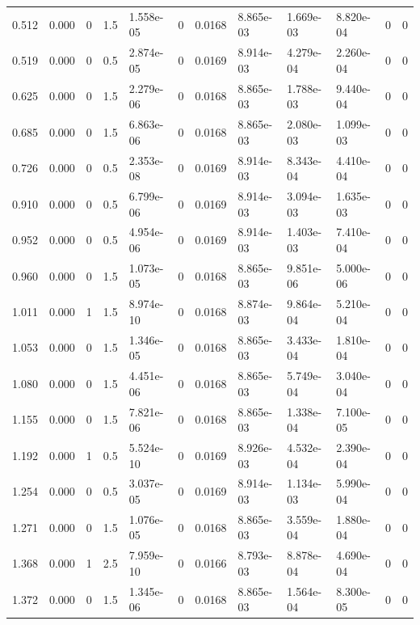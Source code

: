 \documentclass[preview]{standalone}
\begin{document}
{{\begin{tabular}{L{1.2cm}C{1.2cm} C{0.3cm}C{0.5cm} C{1.4cm}C{1.4cm} C{1.4cm}C{1.4cm} C{1.6cm}C{1.6cm} C{1.6cm}C{1.6cm}}
  0.512  &  0.000  & 0     & 1.5 &  1.558e-05  & 0  &  0.0168&   8.865e-03& 1.669e-03 & 8.820e-04   &  0 & 0  \\ 
  0.519  &  0.000  & 0     & 0.5 &  2.874e-05  & 0  &  0.0169&   8.914e-03& 4.279e-04 & 2.260e-04   &  0 & 0  \\ 
  0.625  &  0.000  & 0     & 1.5 &  2.279e-06  & 0  &  0.0168&   8.865e-03& 1.788e-03 & 9.440e-04   &  0 & 0  \\ 
  0.685  &  0.000  & 0     & 1.5 &  6.863e-06  & 0  &  0.0168&   8.865e-03& 2.080e-03 & 1.099e-03   &  0 & 0  \\ 
  0.726  &  0.000  & 0     & 0.5 &  2.353e-08  & 0  &  0.0169&   8.914e-03& 8.343e-04 & 4.410e-04   &  0 & 0  \\ 
  0.910  &  0.000  & 0     & 0.5 &  6.799e-06  & 0  &  0.0169&   8.914e-03& 3.094e-03 & 1.635e-03   &  0 & 0  \\ 
  0.952  &  0.000  & 0     & 0.5 &  4.954e-06  & 0  &  0.0169&   8.914e-03& 1.403e-03 & 7.410e-04   &  0 & 0  \\ 
  0.960  &  0.000  & 0     & 1.5 &  1.073e-05  & 0  &  0.0168&   8.865e-03& 9.851e-06 & 5.000e-06   &  0 & 0  \\ 
  1.011  &  0.000  & 1     & 1.5 &  8.974e-10  & 0  &  0.0168&   8.874e-03& 9.864e-04 & 5.210e-04   &  0 & 0  \\ 
  1.053  &  0.000  & 0     & 1.5 &  1.346e-05  & 0  &  0.0168&   8.865e-03& 3.433e-04 & 1.810e-04   &  0 & 0  \\ 
  1.080  &  0.000  & 0     & 1.5 &  4.451e-06  & 0  &  0.0168&   8.865e-03& 5.749e-04 & 3.040e-04   &  0 & 0  \\ 
  1.155  &  0.000  & 0     & 1.5 &  7.821e-06  & 0  &  0.0168&   8.865e-03& 1.338e-04 & 7.100e-05   &  0 & 0  \\ 
  1.192  &  0.000  & 1     & 0.5 &  5.524e-10  & 0  &  0.0169&   8.926e-03& 4.532e-04 & 2.390e-04   &  0 & 0  \\ 
  1.254  &  0.000  & 0     & 0.5 &  3.037e-05  & 0  &  0.0169&   8.914e-03& 1.134e-03 & 5.990e-04   &  0 & 0  \\ 
  1.271  &  0.000  & 0     & 1.5 &  1.076e-05  & 0  &  0.0168&   8.865e-03& 3.559e-04 & 1.880e-04   &  0 & 0  \\ 
  1.368  &  0.000  & 1     & 2.5 &  7.959e-10  & 0  &  0.0166&   8.793e-03& 8.878e-04 & 4.690e-04   &  0 & 0  \\ 
  1.372  &  0.000  & 0     & 1.5 &  1.345e-06  & 0  &  0.0168&   8.865e-03& 1.564e-04 & 8.300e-05   &  0 & 0  \\ 

\end{tabular}}}
\end{document}
